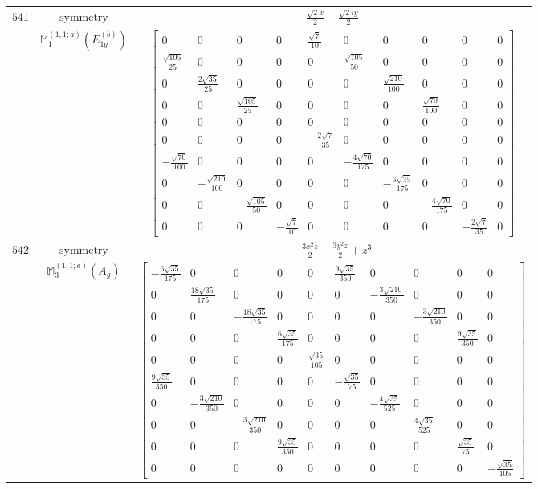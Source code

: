 \documentclass[fleqn,8pt,landscape]{jsarticle}
\begin{document}
\begin{longtable}{ccc}
$ 541 $ & $ \text{symmetry} $ & $ \frac{\sqrt{2} x}{2} - \frac{\sqrt{2} i y}{2} $ \\
$  $ & $ \mathbb{M}_{1}^{(1,1;a)}(E_{1g}^{(b)}) $ & $ \begin{bmatrix} 0 & 0 & 0 & 0 & \frac{\sqrt{7}}{10} & 0 & 0 & 0 & 0 & 0 \\ \frac{\sqrt{105}}{25} & 0 & 0 & 0 & 0 & \frac{\sqrt{105}}{50} & 0 & 0 & 0 & 0 \\ 0 & \frac{2 \sqrt{35}}{25} & 0 & 0 & 0 & 0 & \frac{\sqrt{210}}{100} & 0 & 0 & 0 \\ 0 & 0 & \frac{\sqrt{105}}{25} & 0 & 0 & 0 & 0 & \frac{\sqrt{70}}{100} & 0 & 0 \\ 0 & 0 & 0 & 0 & 0 & 0 & 0 & 0 & 0 & 0 \\ 0 & 0 & 0 & 0 & - \frac{2 \sqrt{7}}{35} & 0 & 0 & 0 & 0 & 0 \\ - \frac{\sqrt{70}}{100} & 0 & 0 & 0 & 0 & - \frac{4 \sqrt{70}}{175} & 0 & 0 & 0 & 0 \\ 0 & - \frac{\sqrt{210}}{100} & 0 & 0 & 0 & 0 & - \frac{6 \sqrt{35}}{175} & 0 & 0 & 0 \\ 0 & 0 & - \frac{\sqrt{105}}{50} & 0 & 0 & 0 & 0 & - \frac{4 \sqrt{70}}{175} & 0 & 0 \\ 0 & 0 & 0 & - \frac{\sqrt{7}}{10} & 0 & 0 & 0 & 0 & - \frac{2 \sqrt{7}}{35} & 0 \end{bmatrix} $ \\ \hline
$ 542 $ & $ \text{symmetry} $ & $ - \frac{3 x^{2} z}{2} - \frac{3 y^{2} z}{2} + z^{3} $ \\
$  $ & $ \mathbb{M}_{3}^{(1,1;a)}(A_{g}) $ & $ \begin{bmatrix} - \frac{6 \sqrt{35}}{175} & 0 & 0 & 0 & 0 & \frac{9 \sqrt{35}}{350} & 0 & 0 & 0 & 0 \\ 0 & \frac{18 \sqrt{35}}{175} & 0 & 0 & 0 & 0 & - \frac{3 \sqrt{210}}{350} & 0 & 0 & 0 \\ 0 & 0 & - \frac{18 \sqrt{35}}{175} & 0 & 0 & 0 & 0 & - \frac{3 \sqrt{210}}{350} & 0 & 0 \\ 0 & 0 & 0 & \frac{6 \sqrt{35}}{175} & 0 & 0 & 0 & 0 & \frac{9 \sqrt{35}}{350} & 0 \\ 0 & 0 & 0 & 0 & \frac{\sqrt{35}}{105} & 0 & 0 & 0 & 0 & 0 \\ \frac{9 \sqrt{35}}{350} & 0 & 0 & 0 & 0 & - \frac{\sqrt{35}}{75} & 0 & 0 & 0 & 0 \\ 0 & - \frac{3 \sqrt{210}}{350} & 0 & 0 & 0 & 0 & - \frac{4 \sqrt{35}}{525} & 0 & 0 & 0 \\ 0 & 0 & - \frac{3 \sqrt{210}}{350} & 0 & 0 & 0 & 0 & \frac{4 \sqrt{35}}{525} & 0 & 0 \\ 0 & 0 & 0 & \frac{9 \sqrt{35}}{350} & 0 & 0 & 0 & 0 & \frac{\sqrt{35}}{75} & 0 \\ 0 & 0 & 0 & 0 & 0 & 0 & 0 & 0 & 0 & - \frac{\sqrt{35}}{105} \end{bmatrix} $ \\ \hline

\end{longtable}
\end{document}
